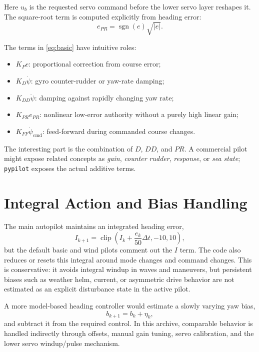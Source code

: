 \documentclass[10pt,twocolumn]{article}
\newcommand{\abs}[1]{\left\lvert #1 \right\rvert}
\newcommand{\sgn}{\operatorname{sgn}}
\newcommand{\clip}{\operatorname{clip}}
\newcommand{\heading}{\psi}
\newcommand{\cmd}{\mathrm{cmd}}
\begin{document}
Here \(u_b\) is the requested servo command before the lower servo layer reshapes it.  The
square-root term is computed explicitly from heading error:
\begin{equation}
  e_{PR} = \sgn(e)\sqrt{\abs{e}}.
  \label{eq:pr}
\end{equation}

The terms in \cref{eq:basic} have intuitive roles:
\begin{itemize}
\item \(K_P e\): proportional correction from course error;
\item \(K_D\dot{\heading}\): gyro counter-rudder or yaw-rate damping;
\item \(K_{DD}\ddot{\heading}\): damping against rapidly changing yaw rate;
\item \(K_{PR}e_{PR}\): nonlinear low-error authority without a purely high linear gain;
\item \(K_{FF}\dot{\heading}_{\cmd}\): feed-forward during commanded course changes.
\end{itemize}

The interesting part is the combination of \(D\), \(DD\), and \(PR\).  A commercial pilot
might expose related concepts as \emph{gain}, \emph{counter rudder}, \emph{response}, or
\emph{sea state}; \texttt{pypilot} exposes the actual additive terms.

\section{Integral Action and Bias Handling}

The main autopilot maintains an integrated heading error,
\begin{equation}
  I_{k+1} = \clip\!\left(I_k + \frac{e_k}{50}\Delta t, -10, 10\right),
  \label{eq:integral}
\end{equation}
but the default basic and wind pilots comment out the \(I\) term.  The code also reduces
or resets this integral around mode changes and command changes.  This is conservative:
it avoids integral windup in waves and maneuvers, but persistent biases such as weather
helm, current, or asymmetric drive behavior are not estimated as an explicit disturbance
state in the active pilot.

A more model-based heading controller would estimate a slowly varying yaw bias,
\begin{equation}
  b_{k+1} = b_k + \eta_k,
\end{equation}
and subtract it from the required control.  In this archive, comparable behavior is
handled indirectly through offsets, manual gain tuning, servo calibration, and the lower
servo windup/pulse mechanism.
\end{document}
